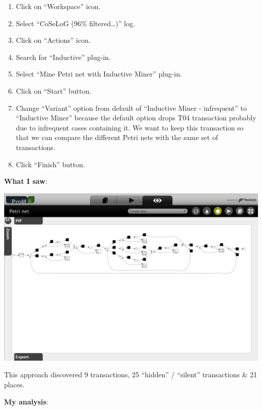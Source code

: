 \documentclass[]{article}
\begin{document}
\begin{enumerate}
\def\labelenumi{\arabic{enumi}.}
\setcounter{enumi}{44}
\itemsep1pt\parskip0pt
\item
  Click on ``Workspace'' icon.\\
\item
  Select ``CoSeLoG (96\% filtered\ldots{})'' log.\\
\item
  Click on ``Actions'' icon.\\
\item
  Search for ``Inductive'' plug-in.\\
\item
  Select ``Mine Petri net with Inductive Miner'' plug-in.\\
\item
  Click on ``Start'' button.
\item
  Change ``Variant'' option from default of ``Inductive Miner -
  infrequent'' to ``Inductive Miner'' because the default option drops
  T04 transaction probably due to infrequent cases containing it. We
  want to keep this transaction so that we can compare the different
  Petri nets with the same set of transactions.\\
\item
  Click ``Finish'' button.
\end{enumerate}

\textbf{What I saw}:

\includegraphics{CoSeLoG_Step_05_Filter96_PetriNet_Inductive.png}

This approach discovered 9 transactions, 25 ``hidden'' / ``silent''
transactions \& 21 places.

\textbf{My analysis}:
\end{document}
